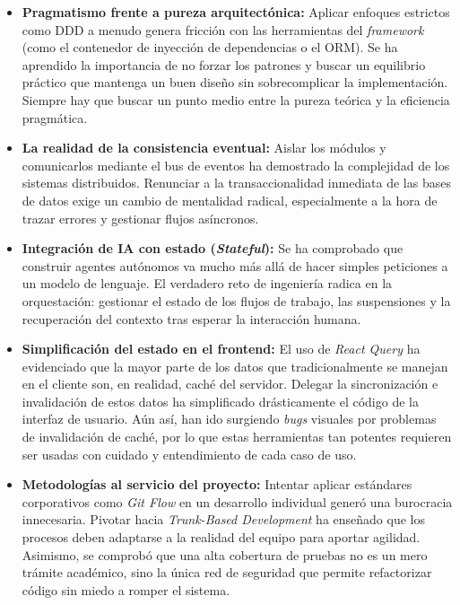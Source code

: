 \begin{itemize}
    \item \textbf{Pragmatismo frente a pureza arquitectónica:} Aplicar enfoques estrictos como \ac{DDD} a menudo genera fricción con las herramientas del \emph{framework} (como el contenedor de inyección de dependencias o el ORM). Se ha aprendido la importancia de no forzar los patrones y buscar un equilibrio práctico que mantenga un buen diseño sin sobrecomplicar la implementación. Siempre hay que buscar un punto medio entre la pureza teórica y la eficiencia pragmática.
    
    \item \textbf{La realidad de la consistencia eventual:} Aislar los módulos y comunicarlos mediante el bus de eventos ha demostrado la complejidad de los sistemas distribuidos. Renunciar a la transaccionalidad inmediata de las bases de datos exige un cambio de mentalidad radical, especialmente a la hora de trazar errores y gestionar flujos asíncronos.
    
    \item \textbf{Integración de IA con estado (\emph{Stateful}):} Se ha comprobado que construir agentes autónomos va mucho más allá de hacer simples peticiones a un modelo de lenguaje. El verdadero reto de ingeniería radica en la orquestación: gestionar el estado de los flujos de trabajo, las suspensiones y la recuperación del contexto tras esperar la interacción humana.
    
    \item \textbf{Simplificación del estado en el frontend:} El uso de \emph{React Query} ha evidenciado que la mayor parte de los datos que tradicionalmente se manejan en el cliente son, en realidad, caché del servidor. Delegar la sincronización e invalidación de estos datos ha simplificado drásticamente el código de la interfaz de usuario. Aún así, han ido surgiendo \emph{bugs} visuales por problemas de invalidación de caché, por lo que estas herramientas tan potentes requieren ser usadas con cuidado y entendimiento de cada caso de uso.
    
    \item \textbf{Metodologías al servicio del proyecto:} Intentar aplicar estándares corporativos como \emph{Git Flow} en un desarrollo individual generó una burocracia innecesaria. Pivotar hacia \emph{Trunk-Based Development} ha enseñado que los procesos deben adaptarse a la realidad del equipo para aportar agilidad. Asimismo, se comprobó que una alta cobertura de pruebas no es un mero trámite académico, sino la única red de seguridad que permite refactorizar código sin miedo a romper el sistema.
\end{itemize}


